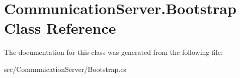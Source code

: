 \hypertarget{class_communication_server_1_1_bootstrap}{}\section{Communication\+Server.\+Bootstrap Class Reference}
\label{class_communication_server_1_1_bootstrap}


The documentation for this class was generated from the following file\+:\begin{DoxyCompactItemize}
\item 
src/\+Communication\+Server/Bootstrap.\+cs\end{DoxyCompactItemize}
